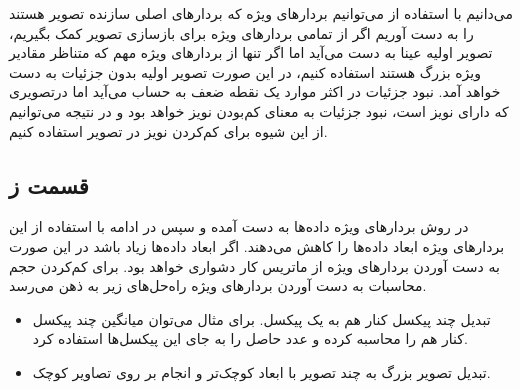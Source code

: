 \documentclass{article}
\begin{document}
می‌دانیم با استفاده از  می‌توانیم بردار‌های ویژه که بردار‌های اصلی سازنده تصویر هستند را به دست آوریم
اگر از تمامی بردار‌های ویژه برای بازسازی تصویر کمک بگیریم، تصویر اولیه عینا به دست می‌آید اما اگر تنها از
بردار‌های ويژه مهم که متناظر مقادیر ویژه بزرگ هستند استفاده کنیم، در این صورت تصویر اولیه بدون جزئیات
به دست خواهد آمد. نبود جزئیات در اکثر موارد یک نقطه ضعف به حساب می‌آید اما درتصویری که دارای نویز است،
نبود جزئیات به معنای کم‌بودن نویز خواهد بود و در نتیجه می‌توانیم از این شیوه برای کم‌کردن نویز در تصویر استفاده کنیم.

\subsection*{قسمت ز}

در روش  بردار‌های ویژه داده‌ها به دست آمده و سپس در ادامه با استفاده از این بردار‌های ویژه
ابعاد داده‌ها را کاهش می‌دهند. اگر ابعاد داده‌ها زیاد باشد در این صورت به دست آوردن بردار‌های ویژه از
ماتریس  کار دشواری خواهد بود. برای کم‌کردن حجم محاسبات به دست آوردن بردار‌های ویژه
راه‌حل‌های زیر به ذهن می‌رسد.

\begin{itemize}
    \item تبدیل چند پیکسل کنار هم به یک پیکسل. برای مثال می‌توان میانگین چند پیکسل کنار هم را محاسبه کرده
    و عدد حاصل را به جای این پیکسل‌ها استفاده کرد.
    \item تبدیل تصویر بزرگ به چند تصویر با ابعاد کوچک‌تر و انجام  بر روی تصاویر کوچک.
\end{itemize}
\end{document}
